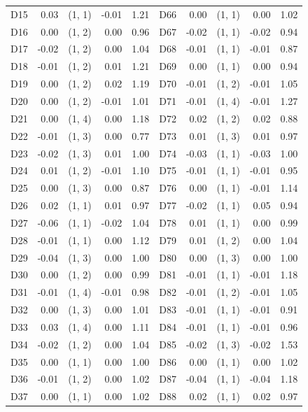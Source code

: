 \begin{table}[p]
\begin{tabular}{l|r|lr|r||l|r|lr|r}
D15 & 0.03 & (1, 1) & -0.01 & 1.21 & D66 & 0.00 & (1, 1) & 0.00 & 1.02 \\
D16 & 0.00 & (1, 2) & 0.00 & 0.96 & D67 & -0.02 & (1, 1) & -0.02 & 0.94 \\
D17 & -0.02 & (1, 2) & 0.00 & 1.04 & D68 & -0.01 & (1, 1) & -0.01 & 0.87 \\
D18 & -0.01 & (1, 2) & 0.01 & 1.21 & D69 & 0.00 & (1, 1) & 0.00 & 0.94 \\
D19 & 0.00 & (1, 2) & 0.02 & 1.19 & D70 & -0.01 & (1, 2) & -0.01 & 1.05 \\
D20 & 0.00 & (1, 2) & -0.01 & 1.01 & D71 & -0.01 & (1, 4) & -0.01 & 1.27 \\
D21 & 0.00 & (1, 4) & 0.00 & 1.18 & D72 & 0.02 & (1, 2) & 0.02 & 0.88 \\
D22 & -0.01 & (1, 3) & 0.00 & 0.77 & D73 & 0.01 & (1, 3) & 0.01 & 0.97 \\
D23 & -0.02 & (1, 3) & 0.01 & 1.00 & D74 & -0.03 & (1, 1) & -0.03 & 1.00 \\
D24 & 0.01 & (1, 2) & -0.01 & 1.10 & D75 & -0.01 & (1, 1) & -0.01 & 0.95 \\
D25 & 0.00 & (1, 3) & 0.00 & 0.87 & D76 & 0.00 & (1, 1) & -0.01 & 1.14 \\
D26 & 0.02 & (1, 1) & 0.01 & 0.97 & D77 & -0.02 & (1, 1) & 0.05 & 0.94 \\
D27 & -0.06 & (1, 1) & -0.02 & 1.04 & D78 & 0.01 & (1, 1) & 0.00 & 0.99 \\
D28 & -0.01 & (1, 1) & 0.00 & 1.12 & D79 & 0.01 & (1, 2) & 0.00 & 1.04 \\
D29 & -0.04 & (1, 3) & 0.00 & 1.00 & D80 & 0.00 & (1, 3) & 0.00 & 1.00 \\
D30 & 0.00 & (1, 2) & 0.00 & 0.99 & D81 & -0.01 & (1, 1) & -0.01 & 1.18 \\
D31 & -0.01 & (1, 4) & -0.01 & 0.98 & D82 & -0.01 & (1, 2) & -0.01 & 1.05 \\
D32 & 0.00 & (1, 3) & 0.00 & 1.01 & D83 & -0.01 & (1, 1) & -0.01 & 0.91 \\
D33 & 0.03 & (1, 4) & 0.00 & 1.11 & D84 & -0.01 & (1, 1) & -0.01 & 0.96 \\
D34 & -0.02 & (1, 2) & 0.00 & 1.04 & D85 & -0.02 & (1, 3) & -0.02 & 1.53 \\
D35 & 0.00 & (1, 1) & 0.00 & 1.00 & D86 & 0.00 & (1, 1) & 0.00 & 1.02 \\
D36 & -0.01 & (1, 2) & 0.00 & 1.02 & D87 & -0.04 & (1, 1) & -0.04 & 1.18 \\
D37 & 0.00 & (1, 1) & 0.00 & 1.02 & D88 & 0.02 & (1, 1) & 0.02 & 0.97 \\

\end{tabular}
\end{table}
